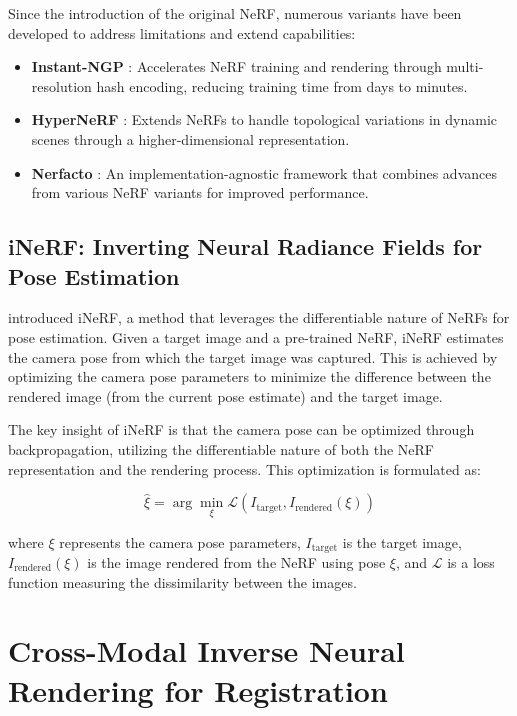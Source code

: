 Since the introduction of the original NeRF, numerous variants have been developed to address limitations and extend capabilities:

\begin{itemize}
    \item \textbf{Instant-NGP} \parencite{muller2022instant}: Accelerates NeRF training and rendering through multi-resolution hash encoding, reducing training time from days to minutes.
    
    \item \textbf{HyperNeRF} \parencite{wang2023hypernerf}: Extends NeRFs to handle topological variations in dynamic scenes through a higher-dimensional representation.
    
    \item \textbf{Nerfacto} \parencite{Tancik_2023}: An implementation-agnostic framework that combines advances from various NeRF variants for improved performance.
\end{itemize}

\subsection{iNeRF: Inverting Neural Radiance Fields for Pose Estimation}

\textcite{yen2020inerf} introduced iNeRF, a method that leverages the differentiable nature of NeRFs for pose estimation. Given a target image and a pre-trained NeRF, iNeRF estimates the camera pose from which the target image was captured. This is achieved by optimizing the camera pose parameters to minimize the difference between the rendered image (from the current pose estimate) and the target image.

The key insight of iNeRF is that the camera pose can be optimized through backpropagation, utilizing the differentiable nature of both the NeRF representation and the rendering process. This optimization is formulated as:

\begin{equation}
    \hat{\xi} = \arg\min_{\xi} \mathcal{L}(I_{\text{target}}, I_{\text{rendered}}(\xi))
\end{equation}

where $\xi$ represents the camera pose parameters, $I_{\text{target}}$ is the target image, $I_{\text{rendered}}(\xi)$ is the image rendered from the NeRF using pose $\xi$, and $\mathcal{L}$ is a loss function measuring the dissimilarity between the images.

\section{Cross-Modal Inverse Neural Rendering for Registration}

